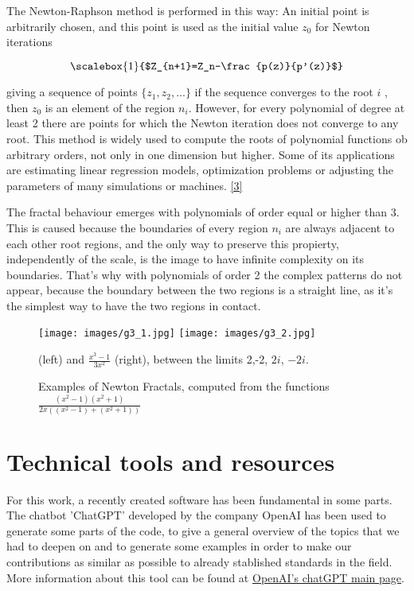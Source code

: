\documentclass{article}
\begin{document}
\vspace{10}
\noindent The Newton-Raphson method is performed in this way: An initial point is arbitrarily chosen, and this point is used as the initial value $z_0$ for Newton iterations 
\begin{center}
\begin{equation*}
\scalebox{1}{$Z_{n+1}=Z_n-\frac{p(z)}{p'(z)}$} 
\end{equation*}
\end{center}
\vspace{10}
giving a sequence of points $\{z_1 , z_2 , ...\}$ if the sequence converges to the root $i$ , then $z_0$ is an element of the region $n_i$. However, for every polynomial of degree at least 2 there are points for which the Newton iteration does not converge to any root. This method is widely used to compute the roots of polynomial functions ob arbitrary orders, not only in one dimension but higher. Some of its applications are estimating linear regression models, optimization problems or adjusting the parameters of many simulations or machines. \hyperref[id3]{[3]}
\vspace{10}

\noindent The fractal behaviour emerges with polynomials of order equal or higher than 3. This is caused because the boundaries of every region $n_i$ are always adjacent to each other root regions, and the only way to preserve this propierty, independently of the scale, is the image to have infinite complexity on its boundaries.
That's why with polynomials of order 2 the complex patterns do not appear, because the boundary between the two regions is a straight line, as it's the simplest way to have the two regions in contact.


\begin{figure}[h!]
\centering
\texttt{[image: images/g3\_1.jpg]}
\texttt{[image: images/g3\_2.jpg]}
\caption{Examples of Newton Fractals, computed from the functions $\frac{(x^2-1)(x^2+1)}{2x((x^2-1)+(x^2+1))}$} (left) and $\frac{x^3-1}{3x^2}$ (right), between the limits 2,-2, $2i$, $-2i$.
\label{exnewton}
\end{figure}


\section{Technical tools and resources}
For this work, a recently created software has been fundamental in some parts. The chatbot 'ChatGPT' developed by the company OpenAI has been used to generate some parts of the code, to give a general overview of the topics that we had to deepen on and to generate some examples in order to make our contributions as similar as possible to already stablished standards in the field. More information about this tool can be found at \href{https://openai.com/blog/chatgpt/}{OpenAI's chatGPT main page}.
\end{document}
